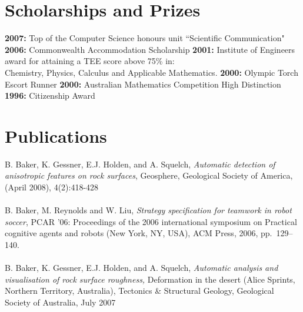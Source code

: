 \documentclass[10pt, a4paper]{report}
\begin{document}
\section*{Scholarships and Prizes}
{\bf 2007:} Top of the Computer Science honours unit ``Scientific Communication" \newline
{\bf 2006:} Commonwealth Accommodation Scholarship \newline
{\bf 2001:} Institute of Engineers award for attaining a TEE score above 75\% in:\\
 Chemistry, Physics, Calculus and Applicable Mathematics. \newline
{\bf 2000:} Olympic Torch Escort Runner	 \newline
{\bf 2000:} Australian Mathematics Competition High Distinction \newline
{\bf 1996:} Citizenship Award


\section*{Publications}
B. Baker, K. Gessner, E.J. Holden, and A. Squelch,  \emph{Automatic detection of anisotropic features on
rock surfaces}, Geosphere, Geological Society of America, (April 2008), 4(2):418-428\\
\\
B. Baker, M. Reynolds and W. Liu, \emph{Strategy specification for
  teamwork in robot soccer}, PCAR '06: Proceedings of the 2006 international
  symposium on Practical cognitive agents and robots (New York, NY, USA), ACM
  Press, 2006, pp.~129--140.\\
  \\
B. Baker, K. Gessner, E.J. Holden, and A. Squelch, \emph{Automatic analysis and 
visualisation of rock surface roughness,} Deformation in the desert (Alice Sprints, Northern 
Territory, Australia), Tectonics \& Structural Geology, Geological Society of Australia, July 
2007
\end{document}
